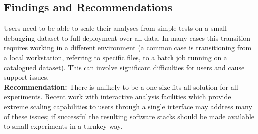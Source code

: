 \subsection{Findings and Recommendations}
Users need to be able to scale their analyses from simple tests on a small debugging dataset to full deployment over all data. In many cases this transition requires working in a different environment (a common case is transitioning from a local workstation, referring to specific files, to a batch job running on a catalogued dataset). This can involve significant difficulties for users and cause support issues.\\
\textbf{Recommendation:} There is unlikely to be a one-size-fits-all solution for all experiments. Recent work with interactive analysis facilities which provide extreme scaling capabilities to users through a single interface may address many of these issues; if successful the resulting software stacks should be made available to small experiments in a turnkey way.\\


